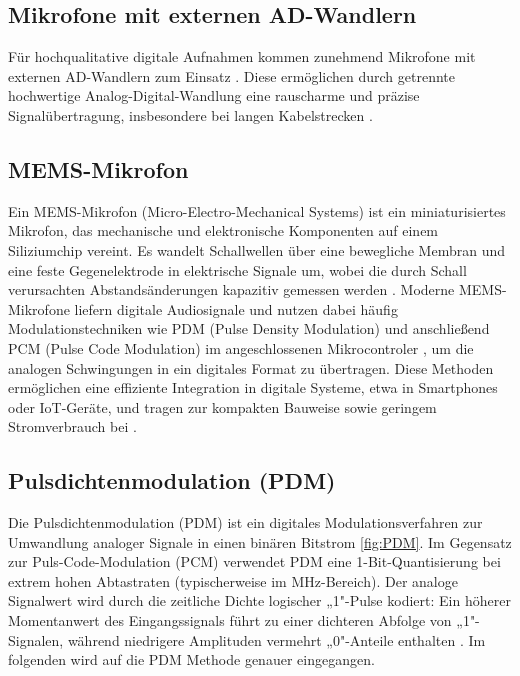 \bigskip

\subsection{Mikrofone mit externen AD-Wandlern}
Für hochqualitative digitale Aufnahmen kommen zunehmend Mikrofone mit externen AD-Wandlern zum Einsatz \cite{Weinzierl:2008}. Diese ermöglichen durch getrennte hochwertige Analog-Digital-Wandlung eine rauscharme und präzise Signalübertragung, insbesondere bei langen Kabelstrecken \cite{Weinzierl:2008}. 

\bigskip

\subsection{MEMS-Mikrofon}
Ein MEMS-Mikrofon (Micro-Electro-Mechanical Systems) ist ein miniaturisiertes Mikrofon, das mechanische und elektronische Komponenten auf einem Siliziumchip vereint. Es wandelt Schallwellen über eine bewegliche Membran und eine feste Gegenelektrode in elektrische Signale um, wobei die durch Schall verursachten Abstandsänderungen kapazitiv gemessen werden \cite{Weinzierl:2008}. Moderne MEMS-Mikrofone liefern digitale Audiosignale und nutzen dabei häufig Modulationstechniken wie PDM (Pulse Density Modulation) und anschließend PCM (Pulse Code Modulation) im angeschlossenen Mikrocontroler , um die analogen Schwingungen in ein digitales Format zu übertragen. Diese Methoden ermöglichen eine effiziente Integration in digitale Systeme, etwa in Smartphones oder IoT-Geräte, und tragen zur kompakten Bauweise sowie geringem Stromverbrauch bei \cite{Weinzierl:2008}.

\bigskip

\subsection{Pulsdichtenmodulation (PDM)}
Die Pulsdichtenmodulation (PDM) ist ein digitales Modulationsverfahren zur Umwandlung analoger Signale in einen binären Bitstrom \ref{fig:PDM}. Im Gegensatz zur Puls-Code-Modulation (PCM) verwendet PDM eine 1-Bit-Quantisierung bei extrem hohen Abtastraten (typischerweise im MHz-Bereich). Der analoge Signalwert wird durch die zeitliche Dichte logischer „1"-Pulse kodiert: Ein höherer Momentanwert des Eingangssignals führt zu einer dichteren Abfolge von „1"-Signalen, während niedrigere Amplituden vermehrt „0"-Anteile enthalten \cite{Weinzierl:2008}. Im folgenden wird auf die PDM Methode genauer eingegangen.

